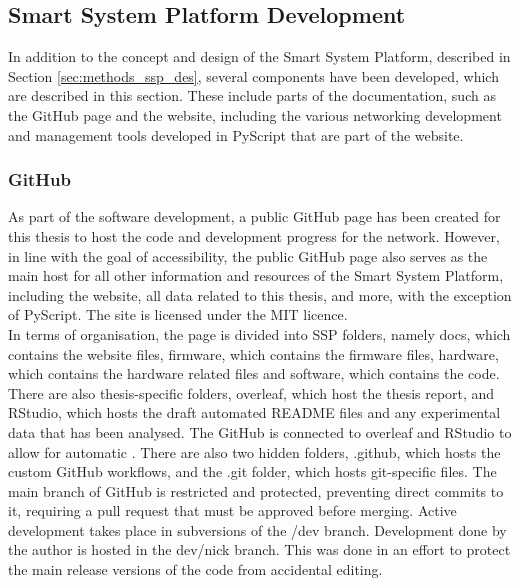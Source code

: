 \subsection{\label{sec:methods_ssp_dev}Smart System Platform Development}

In addition to the concept and design of the Smart System Platform, described in Section \ref{sec:methods_ssp_des}, several components have been developed, which are described in this section. These include parts of the documentation, such as the GitHub page and the website, including the various networking development and management tools developed in PyScript that are part of the website.

\subsubsection{\label{sec:methods_gh}GitHub}
As part of the software development, a public GitHub page has been created for this thesis to host the code and development progress for the network. However, in line with the goal of accessibility, the public GitHub page also serves as the main host for all other information and resources of the Smart System Platform, including the website, all data related to this thesis, and more, with the exception of PyScript. The site is licensed under the MIT licence. \\

In terms of organisation, the page is divided into SSP folders, namely docs, which contains the website files, firmware, which contains the firmware files, hardware, which contains the hardware related files and software, which contains the code. There are also thesis-specific folders, overleaf, which host the thesis report, and RStudio, which hosts the draft automated README files and any experimental data that has been analysed. The GitHub is connected to overleaf and RStudio to allow for automatic . There are also two hidden folders, .github, which hosts the custom GitHub workflows, and the .git folder, which hosts git-specific files. The main branch of GitHub is restricted and protected, preventing direct commits to it, requiring a pull request that must be approved before merging. Active development takes place in subversions of the /dev branch. Development done by the author is hosted in the dev/nick branch. This was done in an effort to protect the main release versions of the code from accidental editing. \\


